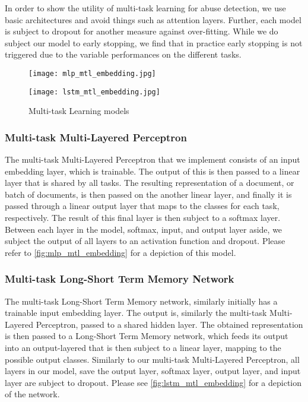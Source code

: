 In order to show the utility of multi-task learning for abuse detection, we use basic architectures and avoid things such as attention layers. Further, each model is subject to dropout for another measure against over-fitting.  While we do subject our model to early stopping, we find that in practice early stopping is not triggered due to the variable performances on the different tasks.

\begin{figure}
  \begin{minipage}{0.5\linewidth}
    \centering
    \texttt{[image: mlp\_mtl\_embedding.jpg]}
    \label{fig:mlp_mtl_embedding}
  \end{minipage}
  \begin{minipage}{0.5\linewidth}
    \centering
    \texttt{[image: lstm\_mtl\_embedding.jpg]}
    \label{fig:lstm_mtl_embedding}
  \end{minipage}
  \caption{Multi-task Learning models}
  \label{fig:mtl_models}
\end{figure}


\subsubsection{Multi-task Multi-Layered Perceptron}

The multi-task Multi-Layered Perceptron that we implement consists of an input embedding layer, which is trainable. The output of this is then passed to a linear layer that is shared by all tasks. The resulting representation of a document, or batch of documents, is then passed on the another linear layer, and finally it is passed through a linear output layer that maps to the classes for each task, respectively. The result of this final layer is then subject to a softmax layer. Between each layer in the model, softmax, input, and output layer aside, we subject the output of all layers to an activation function and dropout. Please refer to \autoref{fig:mlp_mtl_embedding} for a depiction of this model.


\subsubsection{Multi-task Long-Short Term Memory Network}

The multi-task Long-Short Term Memory network, similarly initially has a trainable input embedding layer. The output is, similarly the multi-task Multi-Layered Perceptron, passed to a shared hidden layer. The obtained representation is then passed to a Long-Short Term Memory network, which feeds its output into an output-layered that is then subject to a linear layer, mapping to the possible output classes. Similarly to our multi-task Multi-Layered Perceptron, all layers in our model, save the output layer, softmax layer, output layer, and input layer are subject to dropout. Please see \autoref{fig:lstm_mtl_embedding} for a depiction of the network.


